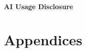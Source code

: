 \documentclass[12pt, oneside]{report}
\begin{document}

%
{\normalfont\large\bfseries AI Usage Disclosure\par}
\vspace{1em}

\clearpage


\appendix
\chapter{Appendices}


\end{document}
